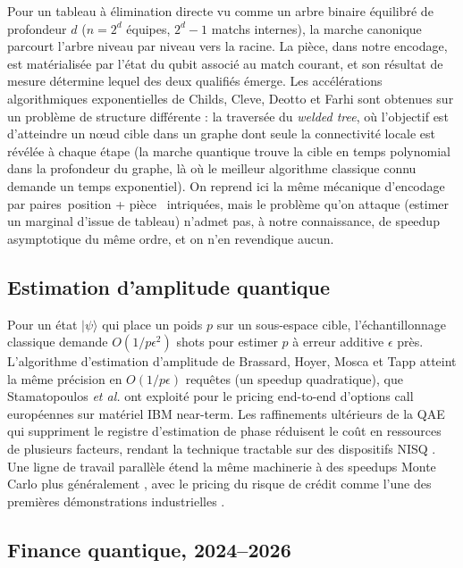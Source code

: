 \documentclass[11pt]{article}
\providecommand{\og}{\guillemotleft\,}
\providecommand{\fg}{\,\guillemotright}
\begin{document}
Pour un tableau à élimination directe vu comme un arbre binaire
équilibré de profondeur $d$ ($n = 2^d$ équipes, $2^d - 1$ matchs
internes), la marche canonique parcourt l'arbre niveau par niveau vers
la racine. La pièce, dans notre encodage, est matérialisée par l'état
du qubit associé au match courant, et son résultat de mesure détermine
lequel des deux qualifiés émerge. Les accélérations algorithmiques
exponentielles de Childs, Cleve, Deotto et Farhi
\cite{childs2003exponential} sont obtenues sur un problème de
structure différente : la traversée du \emph{welded tree}, où
l'objectif est d'atteindre un nœud cible dans un graphe dont seule la
connectivité locale est révélée à chaque étape (la marche quantique
trouve la cible en temps polynomial dans la profondeur du graphe, là
où le meilleur algorithme classique connu demande un temps
exponentiel). On reprend ici la même mécanique d'encodage par paires
\og position + pièce \fg{} intriquées, mais le problème qu'on attaque
(estimer un marginal d'issue de tableau) n'admet pas, à notre
connaissance, de speedup asymptotique du même ordre, et on n'en
revendique aucun.

\subsection{Estimation d'amplitude quantique}

Pour un état $|\psi\rangle$ qui place un poids $p$ sur un sous-espace
cible, l'échantillonnage classique demande $O(1/p\epsilon^2)$ shots
pour estimer $p$ à erreur additive $\epsilon$ près. L'algorithme
d'estimation d'amplitude de Brassard, Hoyer, Mosca et Tapp
\cite{brassard2002quantum} atteint la même précision en
$O(1/p\epsilon)$ requêtes (un speedup quadratique), que Stamatopoulos
\textit{et al.} \cite{stamatopoulos2020option} ont exploité pour le
pricing end-to-end d'options call européennes sur matériel IBM
near-term. Les raffinements ultérieurs de la QAE qui suppriment le
registre d'estimation de phase \cite{suzuki2020amplitude} réduisent le
coût en ressources de plusieurs facteurs, rendant la technique
tractable sur des dispositifs NISQ
\cite{preskill2018nisq, bharti2022nisq}. Une ligne de travail
parallèle étend la même machinerie à des speedups Monte Carlo plus
généralement \cite{montanaro2015quantum}, avec le pricing du risque de
crédit comme l'une des premières démonstrations industrielles
\cite{egger2020option}.

\subsection{Finance quantique, 2024--2026}
\end{document}
